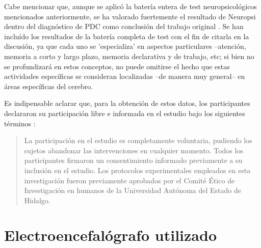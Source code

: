 Cabe mencionar que, aunque se aplic\'o la bater\'ia entera de test neuropsicol\'ogicos mencionados
anteriormente, se ha valorado fuertemente el resultado de Neuropsi dentro del diagn\'ostico de PDC
como conclusi\'on del trabajo original \cite{VazquezTagle16}.
Se han inclu\'ido los resultados de la bater\'ia completa de test con el fin de citarla en la
discusi\'on, ya que cada uno se 'especializa' en aspectos particulares --atenci\'on, memoria a corto
y largo plazo, memoria declarativa y de trabajo, etc; si bien no se profundizar\'a en estos
conceptos, no puede omitirse el hecho que estas actividades espec\'ificas se consideran
localizadas --de manera muy general-- en \'areas espec\'ificas del cerebro.

Es indipensable aclarar que,
para la obtenci\'on de estos datos,
los participantes declararon su participaci\'on libre e informada en el estudio
bajo los siguientes t\'erminos \cite{VazquezTagle16}:
\begin{quote}
La participaci\'on en el estudio es completamente 
voluntaria, pudiendo los sujetos abandonar las intervenciones en cualquier momento. Todos los 
participantes firmaron un consentimiento informado previamente a su inclusi\'on en el estudio. 
Los protocolos experimentales empleados en esta investigaci\'on fueron previamente aprobados por 
el Comit\'e \'Etico de Investigaci\'on en humanos de la Universidad Autónoma del Estado de Hidalgo.
\end{quote}


\section{Electroencefal\'ografo utilizado}

